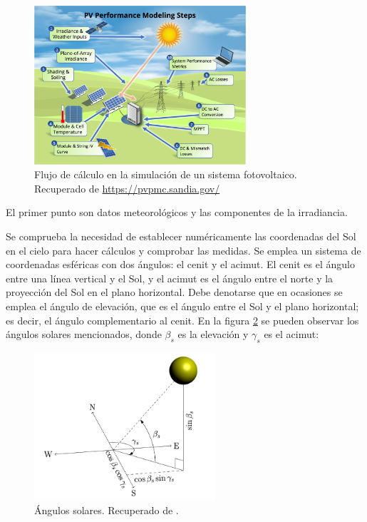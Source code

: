\begin{figure}[H]
      \centering
      \includegraphics[width=0.7\textwidth]{./images/SoA_irrad/pv_simulation_flow.png}
      \caption{Flujo de cálculo en la simulación de un sistema fotovoltaico. Recuperado de \url{https://pvpmc.sandia.gov/}}
      \label{fig:pv_simulation_flow}
\end{figure}

El primer punto son datos meteorológicos y las componentes de la irradiancia.

Se comprueba la necesidad de establecer numéricamente las coordenadas del Sol en el cielo para hacer cálculos y comprobar las medidas. Se emplea un sistema de \gls{coordenadas esféricas} con dos ángulos: el \gls{cenit} y el \gls{acimut}. El cenit es el ángulo entre una línea vertical y el Sol, y el acimut es el ángulo entre el norte y la proyección del Sol en el plano horizontal. Debe denotarse que en ocasiones se emplea el \gls{ángulo de elevación}, que es el ángulo entre el Sol y el plano horizontal; es decir, el ángulo complementario al cenit. En la figura \ref{fig:solar_angles} se pueden observar los ángulos solares mencionados, donde $\beta_s$ es la elevación y $\gamma_s$ es el acimut:

\begin{figure}[h]
      \centering
      \includegraphics[width=0.6\textwidth]{./images/SoA_irrad/Anderson_Mikofski_Fig2.png}
      \caption{Ángulos solares. Recuperado de \cite[Fig. 2]{Anderson_Mikofski_2020}.}
      \label{fig:solar_angles}
\end{figure}

